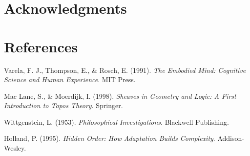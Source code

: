\documentclass{article}
\begin{document}
\section*{Acknowledgments}


\section*{References}

\begin{thebibliography}{9}

Varela, F. J., Thompson, E., \& Rosch, E. (1991). \textit{The Embodied Mind: Cognitive Science and Human Experience}. MIT Press.

Mac Lane, S., \& Moerdijk, I. (1998). \textit{Sheaves in Geometry and Logic: A First Introduction to Topos Theory}. Springer.

Wittgenstein, L. (1953). \textit{Philosophical Investigations}. Blackwell Publishing.

Holland, P. (1995). \textit{Hidden Order: How Adaptation Builds Complexity}. Addison-Wesley.

\end{thebibliography}
\end{document}
